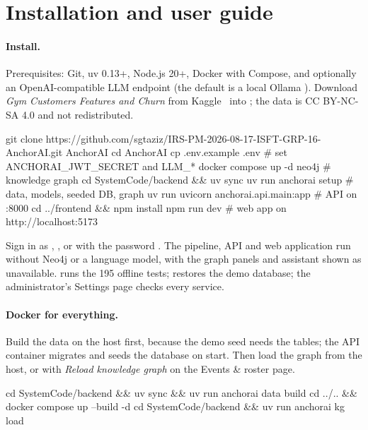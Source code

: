 \documentclass[paper=a4, fontsize=11pt, open=any, parskip=half-,
  headings=small, numbers=noenddot, captions=tableheading, toc=flat]{scrreprt}
\begin{document}
\clearpage
\section{Installation and user guide}
\label{app:install}

\paragraph{Install.} Prerequisites: Git, uv 0.13+, Node.js 20+, Docker with Compose, and optionally an OpenAI-compatible LLM endpoint (the default is a local Ollama ). Download \emph{Gym Customers Features and Churn} from Kaggle~\cite{vinueza-gym} into ; the data is CC BY-NC-SA 4.0 and not redistributed.
\begin{shell}
git clone https://github.com/sgtaziz/IRS-PM-2026-08-17-ISFT-GRP-16-AnchorAI.git AnchorAI
cd AnchorAI
cp .env.example .env                  # set ANCHORAI_JWT_SECRET and LLM_*
docker compose up -d neo4j            # knowledge graph
cd SystemCode/backend && uv sync
uv run anchorai setup                 # data, models, seeded DB, graph
uv run uvicorn anchorai.api.main:app  # API on :8000
cd ../frontend && npm install
npm run dev                           # web app on http://localhost:5173
\end{shell}
Sign in as , ,  or  with the password . The pipeline, API and web application run without Neo4j or a language model, with the graph panels and assistant shown as unavailable.  runs the 195 offline tests;  restores the demo database; the administrator's Settings page checks every service.

\paragraph{Docker for everything.} Build the data on the host first, because the demo seed needs the tables; the API container migrates and seeds the database on start. Then load the graph from the host, or with \emph{Reload knowledge graph} on the Events \& roster page.
\begin{shell}
cd SystemCode/backend && uv sync && uv run anchorai data build
cd ../.. && docker compose up --build -d
cd SystemCode/backend && uv run anchorai kg load
\end{shell}
\end{document}
